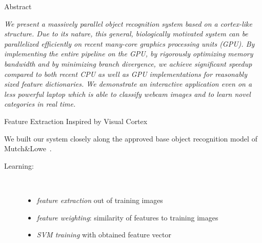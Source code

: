 \documentclass[final]{beamer}
\title[]{}
\author[]{Helmut Sedding, Ferdinand Deger, Holger Dammertz, Jan Bouecke, Hendrik P.\,A.\ Lensch}
\institute[]{Ulm University}
\date{}
\begin{document}
  \begin{frame}{}
  
    \begin{columns}[t]
        \begin{column}{.48\linewidth}
            \begin{block}{Abstract}

\emph{We present a massively parallel object recognition system based on a cortex-like structure. Due to its nature, this general, biologically motivated system can be parallelized efficiently on recent many-core graphics processing units (GPU). By implementing the entire pipeline on the GPU, by rigorously optimizing memory bandwidth and by minimizing branch divergence, we achieve significant speedup compared to both recent CPU as well as GPU implementations for reasonably sized feature dictionaries. We demonstrate an interactive application even on a less powerful laptop which is able to classify webcam images and to learn novel categories in real time.
}\newline
        \end{block}
        
        \begin{block} {Feature Extraction Inspired by Visual Cortex}
        
We built our system closely along the approved base object recognition model of
Mutch\&Lowe~\cite{mutch06}.

\begin{description}

\item[Learning:]~
\begin{itemize}
	\item  \emph{feature extraction} out of training images
	\item  \emph{feature weighting}: similarity of features to training images
	\item  \emph{SVM training} with obtained feature vector
\end{itemize}



\end{description}
\end{block}
\end{column}
\end{columns}
\end{frame}
\end{document}

